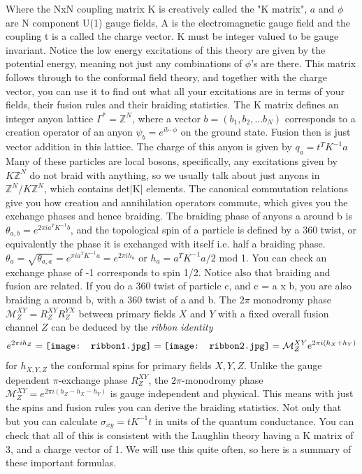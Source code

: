 Where the NxN coupling matrix K is creatively called the "K matrix", $a$ and $\phi$ are N component U(1) gauge fields, A is the electromagnetic gauge field and the coupling t is a called the charge vector. K must be integer valued to be gauge invariant. Notice the low energy excitations of this theory are given by the potential energy, meaning not just any combinations of $\phi$'s are there. This matrix follows through to the conformal field theory, and together with the charge vector, you can use it to find out what all your excitations are in terms of your fields, their fusion rules and their braiding statistics. The K matrix defines an integer anyon lattice $\Gamma^*=\mathbb{Z}^N$, where a vector $b=(b_1,b_2,...b_N)$ corresponds to a creation operator of an anyon $\psi_b=e^{i b \cdot \phi}$ on the ground state. Fusion then is just vector addition in this lattice. The charge of this anyon is given by $q_a = t^TK^{-1}a$ Many of these particles are local bosons, specifically, any excitations given by $K\mathbb{Z}^N$ do not braid with anything, so we usually talk about just anyons in $\mathbb{Z}^N/K\mathbb{Z}^N$, which contains det|K| elements. The canonical commutation relations give you how creation and annihilation operators commute, which gives you the exchange phases and hence braiding. The braiding phase of anyons a around b is $\theta_{a,b} = e^{2\pi i a^T K^{-1} b}$, and the topological spin of a particle is defined by a 360 twist, or equivalently the phase it is exchanged with itself i.e. half a braiding phase. $\theta_a=\sqrt{\theta_{a,a}} = e^{\pi i a^T K^{-1} a} = e^{2 \pi i h_a}$ or $h_a = a^T K^{-1} a /2$ mod 1. You can check an exchange phase of -1 corresponds to spin 1/2. Notice also that braiding and fusion are related. If you do a 360 twist of particle c, and c = a x b, you are also braiding a around b, with a 360 twist of a and b. The $2\pi$ monodromy phase $\mathcal{M}^{XY}_Z=R^{XY}_ZR^{YX}_Z$ between primary fields $X$ and $Y$ with a fixed overall fusion channel $Z$ can be deduced by the {\em ribbon identity}~\cite{Kitaev06} \begin{align}e^{2\pi ih_Z}=\vcenter{\hbox{\texttt{[image: ribbon1.jpg]}}}=\vcenter{\hbox{\texttt{[image: ribbon2.jpg]}}}=\mathcal{M}^{XY}_Ze^{2\pi i(h_X+h_Y)}\label{ribbonapp}\end{align} for $h_{X,Y,Z}$ the conformal spins for primary fields $X,Y,Z$. Unlike the gauge dependent $\pi$-exchange phase $R^{XY}_Z$, the $2\pi$-monodromy phase $\mathcal{M}^{XY}_Z=e^{2\pi i(h_Z-h_X-h_Y)}$ is gauge independent and physical. This means with just the spins and fusion rules you can derive the braiding statistics. Not only that but you can calculate $\sigma_{xy} = tK^{-1}t$ in units of the quantum conductance. You can check that all of this is consistent with the Laughlin theory having a K matrix of 3, and a charge vector of 1. We will use this quite often, so here is a summary of these important formulas.


